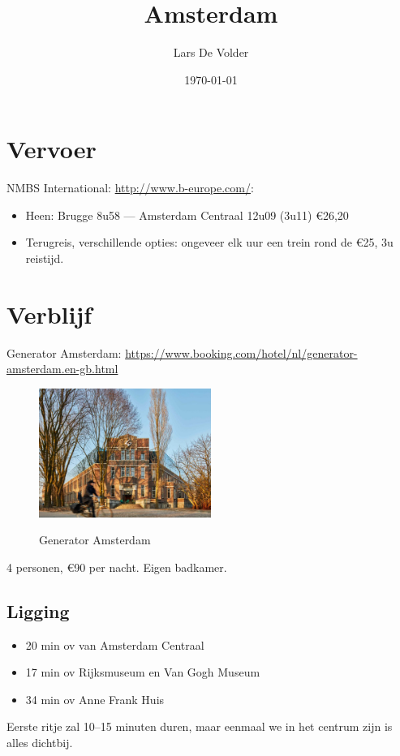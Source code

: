 \documentclass[a4paper, 12pt]{article}
\title{Amsterdam}
\author{Lars De Volder}
\date{\today}
\begin{document}
\maketitle

\section{Vervoer}

NMBS International: \url{http://www.b-europe.com/}:
\begin{itemize}
    \item Heen: Brugge 8u58 --- Amsterdam Centraal 12u09 (3u11) €26,20
    \item Terugreis, verschillende opties: ongeveer elk uur een trein rond de €25, 3u reistijd.
\end{itemize}

\section{Verblijf}

Generator Amsterdam: \url{https://www.booking.com/hotel/nl/generator-amsterdam.en-gb.html}\\
\begin{figure}[h]
    \centering
    \includegraphics[width=0.5\textwidth]{generator_amsterdam.jpg}\label{fig:generator_amsterdam}
    \caption{Generator Amsterdam}
\end{figure}
4 personen, €90 per nacht. Eigen badkamer.

\subsection{Ligging}
\begin{itemize}
    \item 20 min ov van Amsterdam Centraal
    \item 17 min ov Rijksmuseum en Van Gogh Museum
    \item 34 min ov Anne Frank Huis
\end{itemize}
Eerste ritje zal 10--15 minuten duren, maar eenmaal we in het centrum zijn is alles dichtbij.
\end{document}
